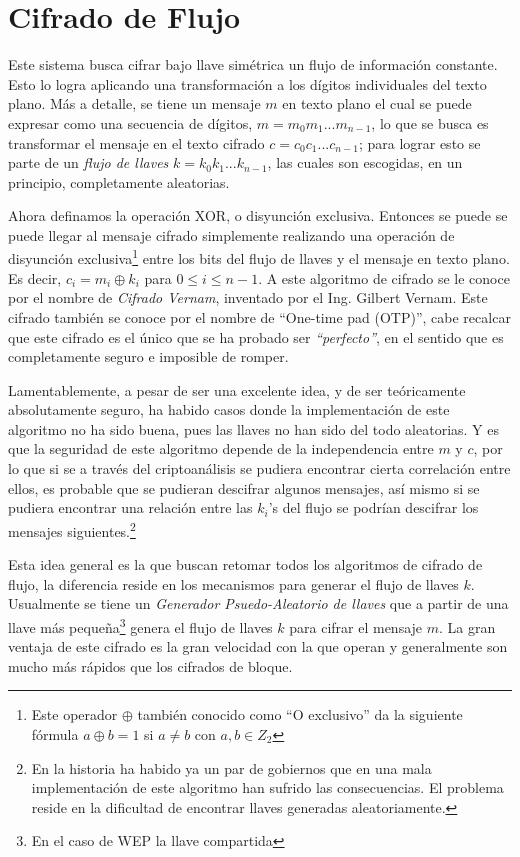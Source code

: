 \section{Cifrado de Flujo} 

Este sistema busca cifrar bajo llave simétrica un flujo de información constante. Esto lo logra aplicando una transformación a los dígitos individuales del texto plano. 
Más a detalle, se tiene un mensaje $m$ en texto plano el cual se puede expresar como una secuencia de dígitos, $m = m_0 m_1...m_{n-1}$,  lo que se busca es transformar el mensaje en el texto cifrado $c = c_0c_1...c_{n-1}$; para lograr esto se parte de un \emph{flujo de llaves} $k = k_0k_1...k_{n-1}$, las cuales son escogidas, en un principio, completamente aleatorias.

Ahora definamos la operación XOR, o disyunción exclusiva.  Entonces se puede se puede llegar al mensaje cifrado simplemente realizando una operación de disyunción exclusiva\footnote{Este operador $ \oplus $ también conocido como ``O exclusivo'' da la siguiente fórmula $a \oplus b = 1$ si $a \neq b$ con $ a , b \in Z_2 $} entre los bits del flujo de llaves y el mensaje en texto plano. Es decir, $c_i = m_i \oplus k_i$ para $0 \leq i\leq n-1$. A este algoritmo de cifrado se le conoce por el nombre de \emph{Cifrado Vernam}, inventado por el Ing. Gilbert Vernam. Este cifrado también se conoce por el nombre de ``One-time pad (OTP)'', cabe recalcar que este cifrado es el único que se ha probado ser  \emph{``perfecto''}, en el sentido que es completamente seguro e imposible de romper.

Lamentablemente, a pesar de ser una excelente idea, y de ser teóricamente absolutamente seguro, ha habido casos donde la implementación de este algoritmo no ha sido buena, pues las llaves no han sido del todo aleatorias. Y es que la seguridad de este algoritmo depende de la independencia entre $m$ y $c$, por lo que si se a través del criptoanálisis se pudiera encontrar cierta correlación entre ellos, es probable que se pudieran descifrar algunos mensajes, así mismo si se pudiera encontrar una relación entre las $k_i$'s del flujo se podrían descifrar los mensajes siguientes.\footnote{En la historia ha habido ya un par de gobiernos que en una mala implementación de este algoritmo han sufrido las consecuencias. El problema reside en la dificultad de encontrar llaves generadas aleatoriamente.}

Esta idea general es la que buscan retomar todos los algoritmos de cifrado de flujo, la diferencia reside en los mecanismos para generar el flujo de llaves $k$. Usualmente se tiene un \emph{Generador Psuedo-Aleatorio de llaves} que a partir de una llave más pequeña\footnote{En el caso de WEP la llave compartida} genera el flujo de llaves $k$ para cifrar el mensaje $m$. La gran ventaja de este cifrado es la gran velocidad con la que operan y generalmente son mucho más rápidos que los cifrados de bloque.

